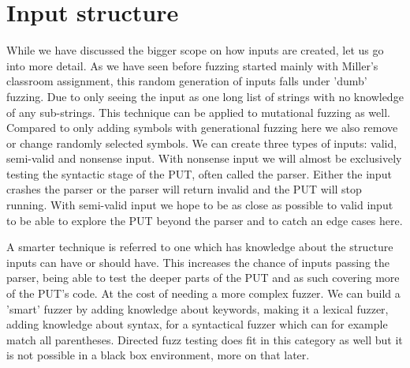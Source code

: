 \section{Input structure}
While we have discussed the bigger scope on how inputs are created, let us go into more detail. As we have seen before fuzzing started mainly with Miller's classroom assignment, this random generation of inputs falls under 'dumb' fuzzing. Due to only seeing the input as one long list of strings with no knowledge of any sub-strings. This technique can be applied to mutational fuzzing as well. Compared to only adding symbols with generational fuzzing here we also remove or change randomly selected symbols. 
We can create three types of inputs: valid, semi-valid and nonsense input. With nonsense input we will almost be exclusively testing the syntactic stage of the PUT, often called the parser. Either the input crashes the parser or the parser will return invalid and the PUT will stop running. With semi-valid input we hope to be as close as possible to valid input to be able to explore the PUT beyond the parser and to catch an edge cases here.

A smarter technique is referred to one which has knowledge about the structure inputs can have or should have. This increases the chance of inputs passing the parser, being able to test the deeper parts of the PUT and as such covering more of the PUT's code. At the cost of needing a more complex fuzzer. We can build a 'smart' fuzzer by adding knowledge about keywords, making it a lexical fuzzer, adding knowledge about syntax, for a syntactical fuzzer which can for example match all parentheses. Directed fuzz testing does fit in this category as well but it is not possible in a black box environment, more on that later.

